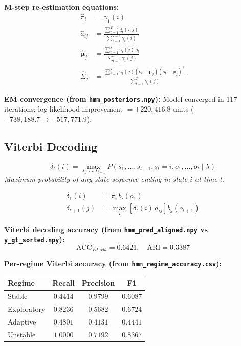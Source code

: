 \documentclass[12pt]{article}
\begin{document}
\noindent\textbf{M-step re-estimation equations:}
\begin{align}
\hat{\pi}_i &= \gamma_1(i) \\
\hat{a}_{ij} &= \frac{\sum_{t=1}^{T-1}\xi_t(i,j)}
  {\sum_{t=1}^{T-1}\gamma_t(i)} \\
\hat{\boldsymbol{\mu}}_j &= \frac{\sum_{t=1}^{T}\gamma_t(j)\,o_t}
  {\sum_{t=1}^{T}\gamma_t(j)} \\
\hat{\Sigma}_j &= \frac{\sum_{t=1}^{T}\gamma_t(j)
  (o_t-\hat{\boldsymbol{\mu}}_j)(o_t-\hat{\boldsymbol{\mu}}_j)^\top}
  {\sum_{t=1}^{T}\gamma_t(j)}
\end{align}

\noindent\textbf{EM convergence (from \texttt{hmm\_posteriors.npy}):} Model converged in 117 iterations; log-likelihood improvement $= +220{,}416.8$ units ($-738{,}188.7 \to -517{,}771.9$).



\subsection{Viterbi Decoding}

\begin{equation}
\delta_t(i) = \max_{s_1,\ldots,s_{t-1}}P(s_1,\ldots,s_{t-1},s_t=i,o_1,\ldots,o_t\mid\lambda)
\end{equation}
\noindent\textit{Maximum probability of any state sequence ending in state $i$ at time $t$.}



\begin{align}
\delta_1(i) &= \pi_i\,b_i(o_1) \\
\delta_{t+1}(j) &= \max_i\left[\delta_t(i)\,a_{ij}\right]
  b_j(o_{t+1})
\end{align}

\noindent\textbf{Viterbi decoding accuracy (from \texttt{hmm\_pred\_aligned.npy} vs \texttt{y\_gt\_sorted.npy}):}
\begin{equation}
\mathrm{ACC}_{Viterbi} = 0.6421, \quad \mathrm{ARI} = 0.3387
\end{equation}


\noindent\textbf{Per-regime Viterbi accuracy (from \texttt{hmm\_regime\_accuracy.csv}):}
\begin{center}\begin{tabular}{lccc}\toprule
Regime & Recall & Precision & F1 \\ \midrule

Stable & $0.4414$ & $0.9799$ & $0.6087$ \\

Exploratory & $0.8236$ & $0.5682$ & $0.6724$ \\

Adaptive & $0.4801$ & $0.4131$ & $0.4441$ \\

Unstable & $1.0000$ & $0.7192$ & $0.8367$ \\

\bottomrule\end{tabular}\end{center}
\end{document}
